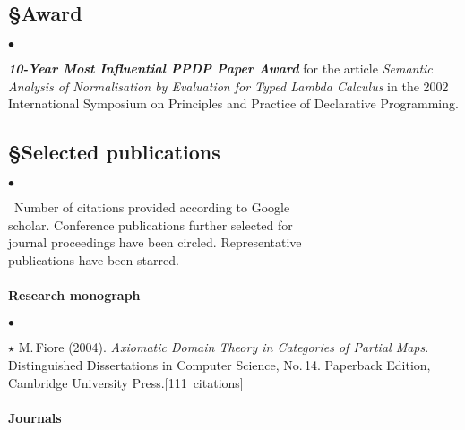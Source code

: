 \documentclass[11pt,twocolumn]{article}
\newenvironment{myitemize}
  {\begin{list}{$\bullet$}
  {\setlength{\topsep}{1pt}
   \setlength{\partopsep}{1pt}
   \setlength{\itemsep}{0pt}
   \setlength{\parsep}{0pt}
   \setlength{\leftmargin}{1em}
   \setlength{\labelwidth}{.5em}}}
  {\end{list}}
\newenvironment{mybigitemize}
  {\begin{list}{$\bullet$}
  {\setlength{\topsep}{2pt}
   \setlength{\partopsep}{2pt}
   \setlength{\itemsep}{2.5pt}
   \setlength{\parsep}{2.5pt}
   \setlength{\leftmargin}{1em}
   \setlength{\labelwidth}{.5em}}}
  {\end{list}}
\begin{document}
\subsection*{\S\enspace\thinspace Award}

\begin{mybigitemize}
\item%
\textbf{\em 10-Year Most Influential PPDP Paper Award} for the article
\emph{Semantic Analysis of Normalisation by Evaluation for Typed Lambda
Calculus} in the 2002 International Symposium on Principles and Practice
of Declarative Programming.
\end{mybigitemize}

\subsection*{\S\enspace\thinspace Selected %
  publications}
\vspace*{-1.125mm}
\begin{myitemize}
\item[]\small\ 
  Number of citations provided according to Google
  \\\mbox{} 
  scholar.  Conference publications further selected for
  \\\mbox{} 
  journal proceedings have been circled.  Representative 
  \\\mbox{} 
  publications have been starred.
\end{myitemize}

\paragraph*{Research monograph}

\begin{mybigitemize}
\item[$\star$] 
  M.\,Fiore (2004). \emph{Axiomatic Domain Theory in Categories of Partial
    Maps}.  Distinguished Dissertations in Computer Science, No.\,14.
  Paperback Edition, Cambridge University
  Press.\mbox{}\hfill{\small[111~citations]}
\end{mybigitemize}

\paragraph*{Journals}
\end{document}
